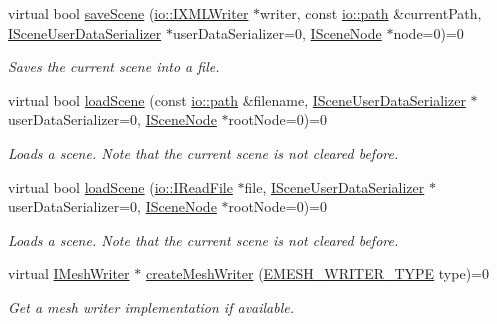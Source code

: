 \begin{DoxyCompactItemize}
virtual bool \hyperlink{classirr_1_1scene_1_1ISceneManager_a824daa42c8bcf5c5eff159a56052000d}{save\+Scene} (\hyperlink{classirr_1_1io_1_1IXMLWriter}{io\+::\+I\+X\+M\+L\+Writer} $\ast$writer, const \hyperlink{namespaceirr_1_1io_a6468281622ce3a1c46b72e19f32dded5}{io\+::path} \&current\+Path, \hyperlink{classirr_1_1scene_1_1ISceneUserDataSerializer}{I\+Scene\+User\+Data\+Serializer} $\ast$user\+Data\+Serializer=0, \hyperlink{classirr_1_1scene_1_1ISceneNode}{I\+Scene\+Node} $\ast$node=0)=0
\begin{DoxyCompactList}\small\item\em Saves the current scene into a file. \end{DoxyCompactList}\item 
virtual bool \hyperlink{classirr_1_1scene_1_1ISceneManager_aa7641dd33e84fca7946ed17047349a3e}{load\+Scene} (const \hyperlink{namespaceirr_1_1io_a6468281622ce3a1c46b72e19f32dded5}{io\+::path} \&filename, \hyperlink{classirr_1_1scene_1_1ISceneUserDataSerializer}{I\+Scene\+User\+Data\+Serializer} $\ast$user\+Data\+Serializer=0, \hyperlink{classirr_1_1scene_1_1ISceneNode}{I\+Scene\+Node} $\ast$root\+Node=0)=0
\begin{DoxyCompactList}\small\item\em Loads a scene. Note that the current scene is not cleared before. \end{DoxyCompactList}\item 
virtual bool \hyperlink{classirr_1_1scene_1_1ISceneManager_a21549d3cae3526313c37d9ed7fd08767}{load\+Scene} (\hyperlink{classirr_1_1io_1_1IReadFile}{io\+::\+I\+Read\+File} $\ast$file, \hyperlink{classirr_1_1scene_1_1ISceneUserDataSerializer}{I\+Scene\+User\+Data\+Serializer} $\ast$user\+Data\+Serializer=0, \hyperlink{classirr_1_1scene_1_1ISceneNode}{I\+Scene\+Node} $\ast$root\+Node=0)=0
\begin{DoxyCompactList}\small\item\em Loads a scene. Note that the current scene is not cleared before. \end{DoxyCompactList}\item 
virtual \hyperlink{classirr_1_1scene_1_1IMeshWriter}{I\+Mesh\+Writer} $\ast$ \hyperlink{classirr_1_1scene_1_1ISceneManager_ae9a06fb68757381f99cfe11ecbd153e6}{create\+Mesh\+Writer} (\hyperlink{namespaceirr_1_1scene_a431fa15741518ba15f6d5f2608b6cb4e}{E\+M\+E\+S\+H\+\_\+\+W\+R\+I\+T\+E\+R\+\_\+\+T\+Y\+PE} type)=0
\begin{DoxyCompactList}\small\item\em Get a mesh writer implementation if available. \end{DoxyCompactList}\item 

\end{DoxyCompactItemize}
